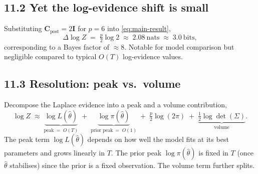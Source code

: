\documentclass[11pt]{article}
\begin{document}
\subsection*{11.2 Yet the log-evidence shift is small}

Substituting $\mathbf C_{\mathrm{post}} = 2\mathbf I$ for $p = 6$ into \eqref{eq:main-result},
\begin{equation}
\Delta\log Z
\;=\;
\tfrac{p}{2}\log 2
\;\approx\;
2.08\ \mathrm{nats}
\;\approx\;
3.0\ \mathrm{bits},
\label{eq:numerical-shift}
\end{equation}
corresponding to a Bayes factor of $\approx 8$. Notable for model comparison but
negligible compared to typical $O(T)$ log-evidence values.

\subsection*{11.3 Resolution: peak vs.\ volume}

Decompose the Laplace evidence into a peak and a volume contribution,
\begin{equation}
\log Z
\;\approx\;
\underbrace{\log L(\hat\theta)}_{\text{peak} \;=\; O(T)}
\;+\;
\underbrace{\log\pi(\hat\theta)}_{\text{prior peak} \;=\; O(1)}
\;+\;
\tfrac{p}{2}\log(2\pi)
\;+\;
\underbrace{\tfrac{1}{2}\log\det(\Sigma)}_{\text{volume}}.
\label{eq:peak-volume-split}
\end{equation}
The peak term $\log L(\hat\theta)$ depends on how well the model fits at its best
parameters and grows linearly in $T$. The prior peak $\log\pi(\hat\theta)$ is fixed in $T$
(once $\hat\theta$ stabilises) since the prior is a fixed observation. The volume term
further splits.
\end{document}
